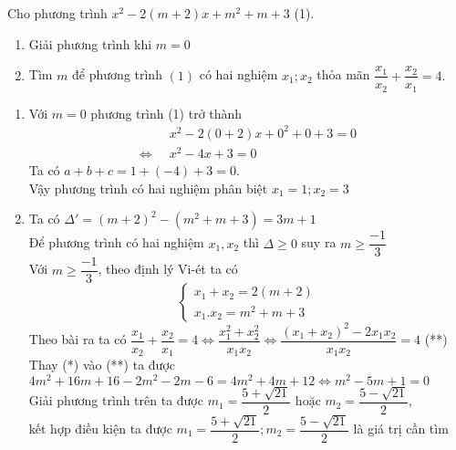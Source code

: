 \begin{ex}%
Cho phương trình $x^2 - 2(m+2)x+m^2+m+3$   \quad\quad (1).
    \begin{enumerate}    
        \item Giải phương trình khi $m = 0$
        \item Tìm $m$ để phương trình $(1)$ có hai nghiệm $x_1; x_2$ thỏa mãn $\dfrac{x_1}{x_2}+\dfrac{x_2}{x_1} = 4.$
    \end{enumerate}
    
    
    
\loigiai
    {
    \begin{enumerate}
        \item Với $m = 0$ phương trình (1) trở thành
        \begin{equation*}
        \begin{aligned}
        & x^2 - 2(0+2)x+0^2+0+3 = 0 \\
        \Leftrightarrow\;\; & x^2 - 4x+3 = 0
        \end{aligned}
         \end{equation*}
    Ta có $a + b + c = 1 + (-4) + 3 = 0$.\\
    Vậy phương trình có hai nghiệm phân biệt $x_ 1 = 1; x_2 = 3$
    \item Ta có $\Delta ' = (m+2)^2 - (m^2+m+3) = 3m + 1$ \\
    Để phương trình có hai nghiệm $x_1,x_2$ thì $\Delta  \geq 0$ suy ra $m \geq \dfrac{-1}{3}$\\
    Với $m \geq \dfrac{-1}{3}$, theo định lý Vi-ét ta có
    \begin{equation}\tag{*}
     \begin{cases}
    x_1+x_2 = 2(m+2)\\
    x_1.x_2 = m^2+m+3
    \end{cases}
    \end{equation}
    Theo bài ra ta có $\dfrac{x_1}{x_2}+\dfrac{x_2}{x_1} = 4 \Leftrightarrow \dfrac{x_1^2+x_2^2}{x_1x_2}\Leftrightarrow \dfrac{(x_1+x_2)^2 - 2x_1x_2}{x_1x_2} = 4$ \quad\quad (**)\\
    Thay (*) vào (**) ta được\\
    $4m^2 + 16m + 16 - 2m^2-2m-6 = 4m^2+4m+12 \Leftrightarrow m^2-5m+1 = 0$\\
    Giải phương trình trên ta được $m_1 = \dfrac{5+\sqrt{21}}{2}\mbox{ hoặc } m_2 = \dfrac{5-\sqrt{21}}{2}$, \\
    kết hợp điều kiện ta được $m_1 = \dfrac{5+\sqrt{21}}{2}; m_2 = \dfrac{5-\sqrt{21}}{2}$ là giá trị cần tìm
    \end{enumerate}
    }
\end{ex}

